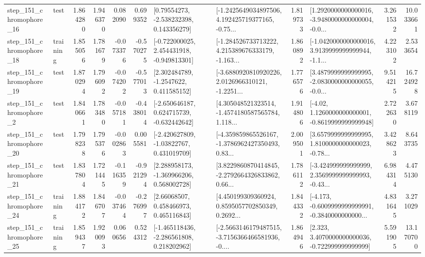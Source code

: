 \begin{tabular}{llrrrrllrlrr}
  step\_151\_chromophore\_16 &      test &      1.864280 &    1.946370 &      0.082090 &  0.699352 &     [0.79554273, -2.538232398, 0.143356279] &  [-1.2425649034897506, 4.192425719377165, -0.75... &       1.819733 &  [1.2920000000000016, -3.9480000000000004, -0.0... &            3.261532 &         10.033661 \\
  step\_151\_chromophore\_18 &  training &      1.855056 &    1.781679 &     -0.073376 & -0.570275 &   [-0.722000025, 2.454431918, -0.949813301] &  [-1.284526733713222, 4.215389676333179, -1.163... &       1.860892 &  [-1.0420000000000016, 3.9139999999999944, -1.1... &            4.223102 &          2.533654 \\
  step\_151\_chromophore\_19 &      test &      1.870294 &    1.796092 &     -0.074202 & -0.577013 &      [2.302484789, -1.2547622, 0.411585152] &  [-3.6880920810920226, 2.0126966310121, -1.2251... &       1.776576 &  [3.4879999999999995, -2.0830000000000055, -0.0... &            9.514215 &         16.724928 \\
   step\_151\_chromophore\_2 &      test &      1.840661 &    1.783480 &     -0.057181 & -0.438014 &   [-2.650646187, 0.624715739, -0.632442642] &  [4.305048521323514, -1.4574180587565784, 1.118... &       1.914806 &   [-4.02, 1.1260000000000001, -0.8619999999999948] &            2.722630 &          3.678119 \\
  step\_151\_chromophore\_20 &      test &      1.798238 &    1.795376 &     -0.002863 &  0.005581 &    [-2.420627809, -1.03822767, 0.431019709] &  [-4.359859865526167, -1.3786962427350493, 0.83... &       2.009501 &  [3.6579999999999995, 1.8100000000000023, -0.78... &            3.428623 &          8.643735 \\
  step\_151\_chromophore\_21 &      test &      1.837804 &    1.721445 &     -0.116359 & -0.921294 &    [2.288958173, -1.369966206, 0.568002728] &  [3.8229860870414845, -2.2792664326833862, 0.66... &       1.786112 &  [-3.424999999999999, 2.3569999999999993, -0.43... &            6.984314 &          4.475130 \\
  step\_151\_chromophore\_24 &  training &      1.884172 &    1.846707 &     -0.037464 & -0.276997 &      [2.66068507, 0.458466973, 0.465116843] &  [4.450199309360924, 0.8595057702850349, 0.2692... &       1.844332 &  [-4.173, -0.6009999999999991, -0.3840000000000... &            4.831645 &          3.271029 \\
  step\_151\_chromophore\_25 &  training &      1.859437 &    1.920093 &      0.060656 &  0.524312 &   [-1.465118436, -2.286561808, 0.218202962] &  [-2.5663146179487515, -3.7156366466581936, -0.... &       1.864946 &    [2.323, 3.4070000000000036, -0.722999999999999] &            5.591905 &         13.170700 \\

\end{tabular}

